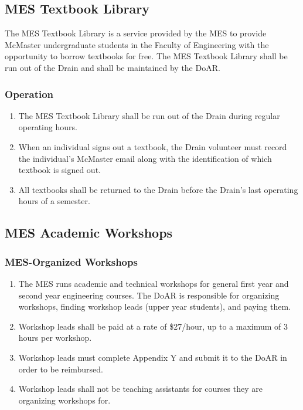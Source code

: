 \subsection{MES Textbook Library}
\label{mes-textbook-library}
The MES Textbook Library is a service provided by the MES to provide
McMaster undergraduate students in the Faculty of Engineering with
the opportunity to borrow textbooks for free. The MES Textbook Library shall be run out of the
Drain and shall be maintained by the DoAR.

\subsubsection{Operation}
\label{operation}

\begin{enumerate}
 \item
  The MES Textbook Library shall be run out of the Drain during regular operating hours.
 \item
  When an individual signs out a textbook, the Drain volunteer must record the individual's McMaster email along with the identification of which textbook is signed out.
 \item
  All textbooks shall be returned to the Drain before the Drain's last operating hours of a semester.
\end{enumerate}

\subsection{MES Academic Workshops}
\label{mes-academic-workshops}

\subsubsection{MES-Organized
 Workshops}
\label{mes-organized-workshops}
\begin{enumerate}
 \item
  The MES runs academic and technical workshops for general first year and second year engineering courses. The DoAR is responsible for organizing workshops, finding workshop leads (upper year students), and paying them.
 \item
  Workshop leads shall be paid at a rate of \$27/hour, up to a maximum of 3 hours per workshop.
 \item
  Workshop leads must complete Appendix Y and submit it to the DoAR in order to be reimbursed.
 \item
  Workshop leads shall not be teaching assistants for courses they are organizing workshops for.
\end{enumerate}

